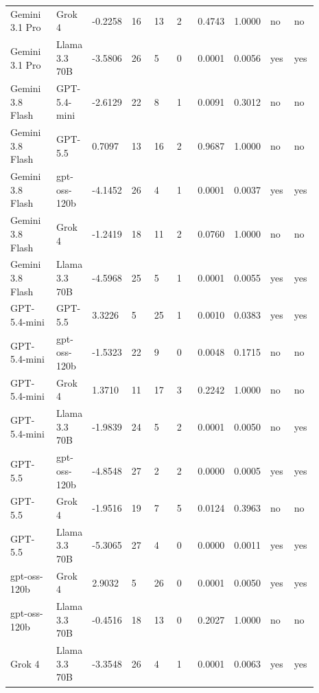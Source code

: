 \begin{landscape}
\begin{longtable}{p{0.162\linewidth}p{0.081\linewidth}p{0.081\linewidth}p{0.081\linewidth}p{0.081\linewidth}p{0.081\linewidth}p{0.081\linewidth}p{0.081\linewidth}p{0.081\linewidth}p{0.081\linewidth}}
Gemini 3.1 Pro & Grok 4 & -0.2258 & 16 & 13 & 2 & 0.4743 & 1.0000 & no & no \\
Gemini 3.1 Pro & Llama 3.3 70B & -3.5806 & 26 & 5 & 0 & 0.0001 & 0.0056 & yes & yes \\
Gemini 3.8 Flash & GPT-5.4-mini & -2.6129 & 22 & 8 & 1 & 0.0091 & 0.3012 & no & no \\
Gemini 3.8 Flash & GPT-5.5 & 0.7097 & 13 & 16 & 2 & 0.9687 & 1.0000 & no & no \\
Gemini 3.8 Flash & gpt-oss-120b & -4.1452 & 26 & 4 & 1 & 0.0001 & 0.0037 & yes & yes \\
Gemini 3.8 Flash & Grok 4 & -1.2419 & 18 & 11 & 2 & 0.0760 & 1.0000 & no & no \\
Gemini 3.8 Flash & Llama 3.3 70B & -4.5968 & 25 & 5 & 1 & 0.0001 & 0.0055 & yes & yes \\
GPT-5.4-mini & GPT-5.5 & 3.3226 & 5 & 25 & 1 & 0.0010 & 0.0383 & yes & yes \\
GPT-5.4-mini & gpt-oss-120b & -1.5323 & 22 & 9 & 0 & 0.0048 & 0.1715 & no & no \\
GPT-5.4-mini & Grok 4 & 1.3710 & 11 & 17 & 3 & 0.2242 & 1.0000 & no & no \\
GPT-5.4-mini & Llama 3.3 70B & -1.9839 & 24 & 5 & 2 & 0.0001 & 0.0050 & no & yes \\
GPT-5.5 & gpt-oss-120b & -4.8548 & 27 & 2 & 2 & 0.0000 & 0.0005 & yes & yes \\
GPT-5.5 & Grok 4 & -1.9516 & 19 & 7 & 5 & 0.0124 & 0.3963 & no & no \\
GPT-5.5 & Llama 3.3 70B & -5.3065 & 27 & 4 & 0 & 0.0000 & 0.0011 & yes & yes \\
gpt-oss-120b & Grok 4 & 2.9032 & 5 & 26 & 0 & 0.0001 & 0.0050 & yes & yes \\
gpt-oss-120b & Llama 3.3 70B & -0.4516 & 18 & 13 & 0 & 0.2027 & 1.0000 & no & no \\
Grok 4 & Llama 3.3 70B & -3.3548 & 26 & 4 & 1 & 0.0001 & 0.0063 & yes & yes \\
\bottomrule
\end{longtable}
\normalsize
\end{landscape}

